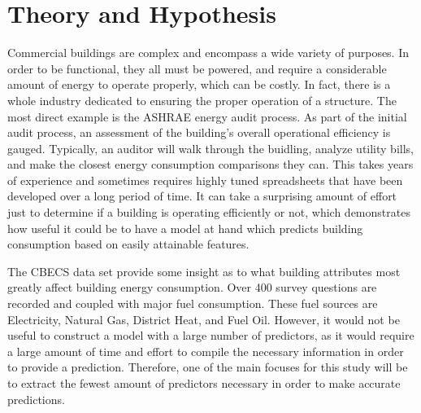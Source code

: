 \section{Theory and Hypothesis}
\label{sec:theory_and_hypothesis}

Commercial buildings are complex and encompass a wide variety of purposes. In order to be functional, they all must be powered, and require a considerable amount of energy to operate properly, which can be costly.  In fact, there is a whole industry dedicated to ensuring the proper operation of a structure.  The most direct example is the ASHRAE energy audit process.  As part of the initial audit process, an assessment of the building's overall operational efficiency is gauged.  Typically, an auditor will walk through the buidling, analyze utility bills, and make the closest energy consumption comparisons they can.  This takes years of experience and sometimes requires highly tuned spreadsheets that have been developed over a long period of time.  It can take a surprising amount of effort just to determine if a building is operating efficiently or not, which demonstrates how useful it could be to have a model at hand which predicts building consumption based on easily attainable features.

The CBECS data set provide some insight as to what building attributes most greatly affect building energy consumption.  Over 400 survey questions are recorded and coupled with major fuel consumption.  These fuel sources are Electricity, Natural Gas, District Heat, and Fuel Oil.  However, it would not be useful to construct a model with a large number of predictors, as it would require a large amount of time and effort to compile the necessary information in order to provide a prediction.  Therefore, one of the main focuses for this study will be to extract the fewest amount of predictors necessary in order to make accurate predictions.  